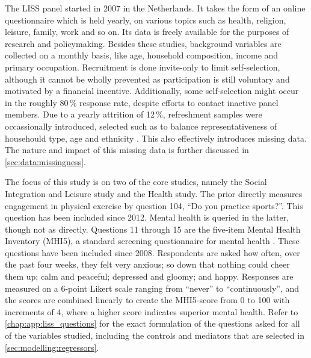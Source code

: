 The LISS panel \cite{scherpenzeel2010liss} started in 2007 in the Netherlands. It takes the form of an online questionnaire
which is held yearly, on various topics such as health, religion, leisure, family, work and so on.
Its data is freely available for the purposes of research and policymaking.
Besides these studies, background variables are collected on a monthly basis, like age, household composition,
income and primary occupation.
Recruitment is done invite-only to limit self-selection, although it cannot be wholly prevented as
participation is still voluntary and motivated by a financial incentive. Additionally, some self-selection might occur
in the roughly 80\,\% response rate, despite efforts to contact inactive panel members. Due to a yearly attrition of 12\,\%,
refreshment samples were occassionally introduced, selected such as to balance representativeness of househould type,
age and ethnicity \cite{lissdata_methodology}. This also effectively introduces missing data.
The nature and impact of this missing data is further discussed in \cref{sec:data:missingness}.

The focus of this study is on two of the core studies, namely the Social Integration and Leisure study and the Health study.
The prior directly measures engagement in physical exercise by question 104, ``Do you practice sports?''. This question
has been included since 2012.
Mental health is queried in the latter, though not as directly. Questions 11 through 15 are the five-item Mental Health Inventory
(MHI5), a standard screening questionnaire for mental health \cite{berwick1991performance}. These questions have been included
since 2008.
Respondents are asked how often, over the past four weeks,
they felt very anxious; so down that nothing could cheer them up; calm and peaceful; depressed and gloomy; and happy.
Responses are measured on a 6-point Likert scale ranging from ``never'' to ``continuously'', and the scores are combined
linearly to create the MHI5-score from 0 to 100 with increments of 4, where a higher score indicates superior mental health.
Refer to \cref{chap:app:liss_questions} for the exact formulation of the questions asked for all of the variables studied,
including the controls and mediators that are selected in \cref{sec:modelling:regressors}.

